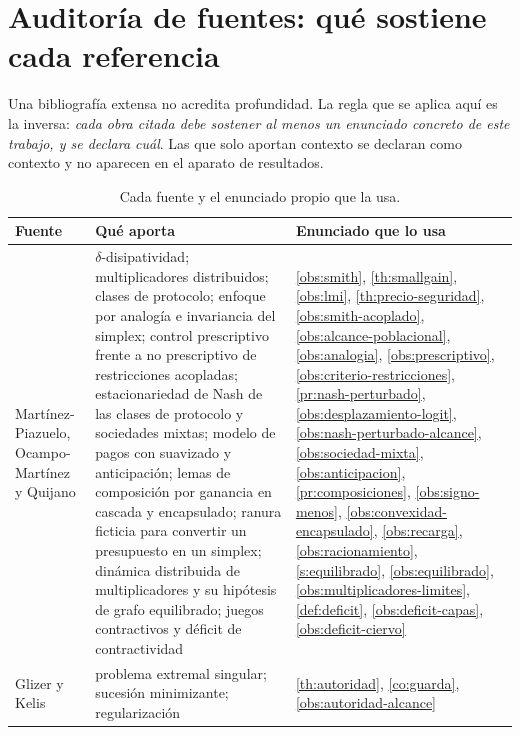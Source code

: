 \section{Auditoría de fuentes: qué sostiene cada referencia}
\label{sec:auditoria}

Una bibliografía extensa no acredita profundidad. La regla que se aplica aquí es
la inversa: \emph{cada obra citada debe sostener al menos un enunciado concreto
de este trabajo, y se declara cuál}. Las que solo aportan contexto se declaran
como contexto y no aparecen en el aparato de resultados.

\begin{table}[!ht]
\centering\small
\caption{Cada fuente y el enunciado propio que la usa.}
\label{tab:auditoria}
\begin{tabularx}{\textwidth}{@{}p{4.6cm}p{3.5cm}X@{}}
\toprule
Fuente & Qué aporta & Enunciado que lo usa \\
\midrule
Martínez-Piazuelo, Ocampo-Martínez y Quijano \cite{martinezPiazuelo2025gne}
  & $\delta$-disipatividad; multiplicadores distribuidos; clases de protocolo;
    enfoque por analogía e invariancia del simplex; control prescriptivo frente a
    no prescriptivo de restricciones acopladas; estacionariedad de Nash de las
    clases de protocolo y sociedades mixtas; modelo de pagos con suavizado y
    anticipación; lemas de composición por ganancia en cascada y encapsulado;
    ranura ficticia para convertir un presupuesto en un simplex; dinámica
    distribuida de multiplicadores y su hipótesis de grafo equilibrado; juegos
    contractivos y déficit de contractividad
  & \cref{obs:smith}, \cref{th:smallgain}, \cref{obs:lmi},
    \cref{th:precio-seguridad}, \cref{obs:smith-acoplado},
    \cref{obs:alcance-poblacional}, \cref{obs:analogia},
    \cref{obs:prescriptivo}, \cref{obs:criterio-restricciones},
    \cref{pr:nash-perturbado}, \cref{obs:desplazamiento-logit},
    \cref{obs:nash-perturbado-alcance}, \cref{obs:sociedad-mixta},
    \cref{obs:anticipacion}, \cref{pr:composiciones},
    \cref{obs:signo-menos}, \cref{obs:convexidad-encapsulado},
    \cref{obs:recarga}, \cref{obs:racionamiento},
    \cref{s:equilibrado}, \cref{obs:equilibrado},
    \cref{obs:multiplicadores-limites}, \cref{def:deficit},
    \cref{obs:deficit-capas}, \cref{obs:deficit-ciervo} \\
Glizer y Kelis \cite{glizer2022singular}
  & problema extremal singular; sucesión minimizante; regularización
  & \cref{th:autoridad}, \cref{co:guarda}, \cref{obs:autoridad-alcance} \\

\end{tabularx}
\end{table}
